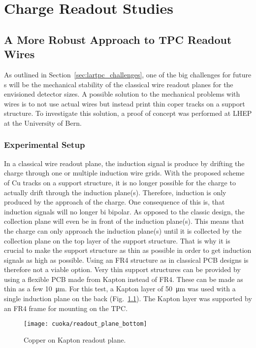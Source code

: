 \chapter{Charge Readout Studies}
\label{chap:charge-ro}


\section{A More Robust Approach to TPC Readout Wires}
\label{sec:charge-ro_cuoka}

As outlined in Section~\ref{sec:lartpc_challenges}, one of the big challenges for future \lartpc{}s will be the mechanical stability of the classical wire readout planes for the envisioned detector sizes.
A possible solution to the mechanical problems with wires is to not use actual wires but instead print thin coper tracks on a support structure.
To investigate this solution, a proof of concept was performed at LHEP at the University of Bern.


\subsection*{Experimental Setup}

In a classical wire readout plane, the induction signal is produce by drifting the charge through one or multiple induction wire grids.
With the proposed scheme of \si{Cu} tracks on a support structure, it is no longer possible for the charge to actually drift through the induction plane(s).
Therefore, induction is only produced by the approach of the charge.
One consequence of this is, that induction signals will no longer bi bipolar.
As opposed to the classic design, the collection plane will even be in front of the induction plane(s).
This means that the charge can only approach the induction plane(s) until it is collected by the collection plane on the top layer of the support structure.
That is why it is crucial to make the support structure as thin as possible in order to get induction signals as high as possible.
Using an FR4 structure as in classical PCB designs is therefore not a viable option.
Very thin support structures can be provided by using a flexible PCB made from Kapton instead of FR4.
These can be made as thin as a few \SI{10}{\micro\metre}.
For this test, a Kapton layer of \SI{50}{\micro\metre} was used with a single induction plane on the back (Fig.~\ref{fig:cuoka_readout-plane}).
The Kapton layer was supported by an FR4 frame for mounting on the TPC.

\begin{figure}[htb]
	\centering
	\texttt{[image: cuoka/readout\_plane\_bottom]}
	\caption{Copper on Kapton readout plane.}
	\label{fig:cuoka_readout-plane}
\end{figure}

